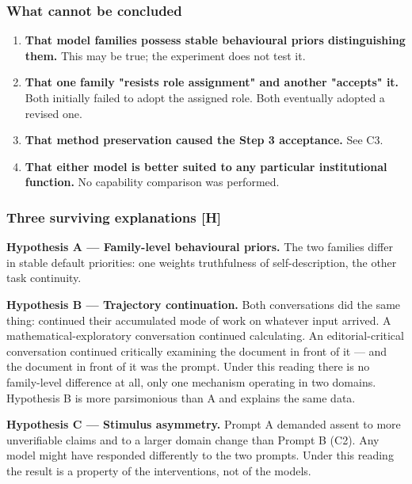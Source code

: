 \subsubsection*{What cannot be concluded}
\label{sec:en:x-what-cannot-be-concluded}

\begin{enumerate}
  \item \textbf{That model families possess stable behavioural priors distinguishing them.} This may be true; the experiment does not test it.
  \item \textbf{That one family "resists role assignment" and another "accepts" it.} Both initially failed to adopt the assigned role. Both eventually adopted a revised one.
  \item \textbf{That method preservation caused the Step 3 acceptance.} See C3.
  \item \textbf{That either model is better suited to any particular institutional function.} No capability comparison was performed.
\end{enumerate}

\subsubsection*{Three surviving explanations \textbf{[H]}}
\label{sec:en:x-three-surviving-explanations-h}

\textbf{Hypothesis A — Family-level behavioural priors.} The two families differ in stable default priorities: one weights truthfulness of self-description, the other task continuity.

\textbf{Hypothesis B — Trajectory continuation.} Both conversations did the same thing: continued their accumulated mode of work on whatever input arrived. A mathematical-exploratory conversation continued calculating. An editorial-critical conversation continued critically examining the document in front of it — and the document in front of it was the prompt. Under this reading there is no family-level difference at all, only one mechanism operating in two domains. Hypothesis B is more parsimonious than A and explains the same data.

\textbf{Hypothesis C — Stimulus asymmetry.} Prompt A demanded assent to more unverifiable claims and to a larger domain change than Prompt B (C2). Any model might have responded differently to the two prompts. Under this reading the result is a property of the interventions, not of the models.

